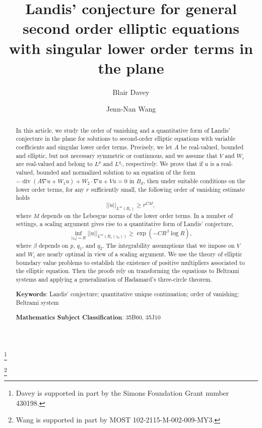 \documentclass[12pt,reqno]{amsart}
\date{}
\theoremstyle{plain}
\theoremstyle{definition}
\DeclareMathOperator{\di}{div}
\newcommand{\be}{\beta}
\newcommand{\iny}{\infty}
\newcommand{\gr}{\nabla}
\newcommand{\norm}[1]{\left\vert \left\vert #1\right\vert\right\vert}
\newcommand{\abs}[1]{\left\vert#1\right\vert}
\newcommand{\pr}[1]{\left( #1 \right) }
\newcommand{\Keywords}[1]{\par\noindent 
{\small{\bf Keywords\/}: #1}}
\newcommand{\MSC}[1]{\par\noindent 
{\small{\bf Mathematics Subject Classification\/}: #1}}
\begin{document}
\title{Landis' conjecture for general second order elliptic equations \\
with singular lower order terms in the plane}

\author[Davey]{Blair Davey}
\address{Department of Mathematics, City College of New York CUNY, New York, NY 10031, USA}
\thanks{Davey is supported in part by the Simons Foundation Grant number 430198.}
%
%
\author[Wang]{Jenn-Nan Wang}
\address{Institute of Applied Mathematical Sciences, NCTS, National Taiwan University, \\
Taipei 106, Taiwan}
\thanks{Wang is supported in part by MOST 102-2115-M-002-009-MY3.}

\begin{abstract}
In this article, we study the order of vanishing and a quantitative form of Landis' conjecture in the plane for solutions to second-order elliptic equations with variable coefficients and singular lower order terms. 
Precisely, we let $A$ be real-valued, bounded and elliptic, but not necessary symmetric or continuous, and we assume that $V$ and $W_i$ are real-valued and belong to $L^p$ and $L^{q_i}$, respectively. 
We prove that if $u$ is a real-valued, bounded and normalized solution to an equation of the form $-\di \pr{A \gr u + W_1 u} + W_2 \cdot \gr u + V u = 0$ in $B_d$, then under suitable conditions on the lower order terms, for any $r$ sufficiently small, the following order of vanishing estimate holds
$$\norm{u}_{L^\iny\pr{B_r}} \ge r^{C M},$$
where $M$ depends on the Lebesgue norms of the lower order terms.
In a number of settings, a scaling argument gives rise to a quantitative form of Landis' conjecture,
\[
\inf_{\abs{z_0} = R} \norm{u}_{L^\iny\pr{B_1\pr{z_0}}} \ge \exp\pr{- C R^\be \log R},
\]
where $\be$ depends on $p$, $q_1$, and $q_2$. 
The integrability assumptions that we impose on $V$ and $W_i$ are nearly optimal in view of a scaling argument. 
We use the theory of elliptic boundary value problems to establish the existence of positive multipliers associated to the elliptic equation.
Then the proofs rely on transforming the equations to Beltrami systems and applying a generalization of Hadamard's three-circle theorem. \\

\Keywords{Landis' conjecture; quantitative unique continuation; order of vanishing; Beltrami system} \\

\MSC{35B60, 35J10} 
\end{abstract}
\end{document}
